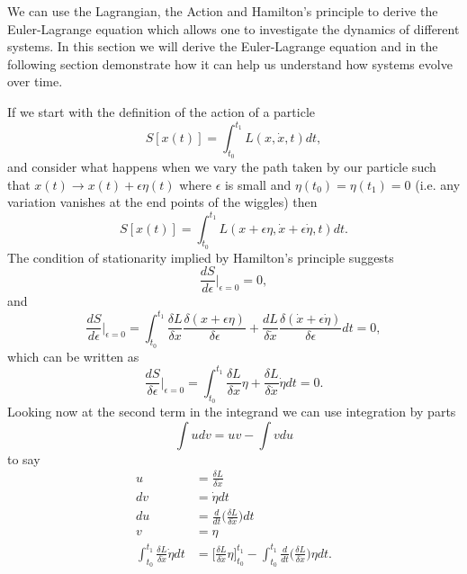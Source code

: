 \documentclass{article}
\begin{document}
We can use the Lagrangian, the Action and Hamilton's principle to derive the Euler-Lagrange equation which allows one to investigate the dynamics of different systems. In this section we will derive the Euler-Lagrange equation and in the following section demonstrate how it can help us understand how systems evolve over time.

If we start with the definition of the action of a particle
\begin{equation}
    S[x(t)] = \int_{t_0}^{t_1} L(x, \dot{x}, t) dt,
\end{equation}
and consider what happens when we vary the path taken by our particle such that $x(t) \rightarrow x(t) + \epsilon \eta(t)$ where $\epsilon$ is small and $\eta(t_0) = \eta(t_1) = 0$ (i.e. any variation vanishes at the end points of the wiggles) then
\begin{equation}
    S[x(t)] = \int_{t_0}^{t_1} L(x + \epsilon \eta, \dot{x} + \epsilon \dot{\eta}, t) dt.
\end{equation}
The condition of stationarity implied by Hamilton's principle suggests
\begin{equation}
    \frac{dS}{d\epsilon} \bigg|_{\epsilon = 0} = 0,
\end{equation}
and
\begin{equation}
    \frac{dS}{d\epsilon} \bigg|_{\epsilon = 0} = \int_{t_0}^{t_1} \frac{\delta L}{\delta x}\frac{\delta (x + \epsilon \eta)}{\delta \epsilon} + \frac{dL}{\delta \dot{x}}\frac{\delta (\dot{x} + \epsilon \dot{\eta})}{\delta \epsilon} dt = 0,
\end{equation}
which can be written as
\begin{equation}
    \frac{dS}{\delta \epsilon} \bigg|_{\epsilon = 0} = \int_{t_0}^{t_1} \frac{\delta L}{\delta x}\eta + \frac{\delta L}{\delta \dot{x}}\dot{\eta} dt = 0.
    \label{eq:pre-integration-by-parts}
\end{equation}
Looking now at the second term in the integrand we can use integration by parts
\begin{equation}
    \int u dv = uv - \int v du
\end{equation}
to say
\begin{equation}
    \begin{aligned}
        u & = \frac{\delta L}{\delta \dot{x}} \\
        dv & = \dot{\eta} dt \\ 
        du &= \frac{d}{dt} \bigg( \frac{\delta L}{\delta \dot{x}} \bigg) dt \\
        v & = \eta \\
        \int_{t_0}^{t_1} \frac{\delta L}{\delta \dot{x}}\dot{\eta} dt & = \bigg[ \frac{\delta L}{\delta \dot{x}}\eta\bigg]^{t_1}_{t_0} - \int_{t_0}^{t_1} \frac{d}{dt}\bigg(\frac{\delta L}{\delta \dot{x}}\bigg) \eta dt.
    \end{aligned}
\end{equation}
\end{document}
